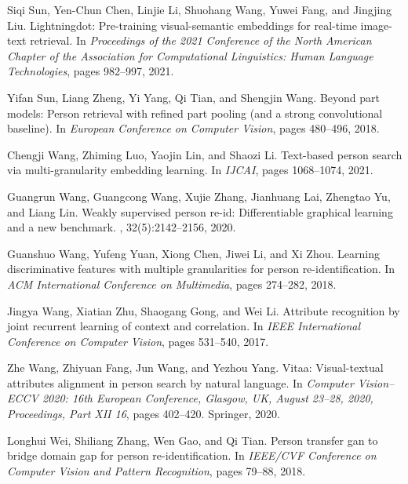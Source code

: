 \documentclass[10pt,twocolumn,letterpaper]{article}
\begin{document}
\begin{thebibliography}{10}
Siqi Sun, Yen-Chun Chen, Linjie Li, Shuohang Wang, Yuwei Fang, and Jingjing
  Liu.
\newblock Lightningdot: Pre-training visual-semantic embeddings for real-time
  image-text retrieval.
\newblock In {\em Proceedings of the 2021 Conference of the North American
  Chapter of the Association for Computational Linguistics: Human Language
  Technologies}, pages 982--997, 2021.

Yifan Sun, Liang Zheng, Yi Yang, Qi Tian, and Shengjin Wang.
\newblock Beyond part models: Person retrieval with refined part pooling (and a
  strong convolutional baseline).
\newblock In {\em European Conference on Computer Vision}, pages 480--496,
  2018.

Chengji Wang, Zhiming Luo, Yaojin Lin, and Shaozi Li.
\newblock Text-based person search via multi-granularity embedding learning.
\newblock In {\em IJCAI}, pages 1068--1074, 2021.

Guangrun Wang, Guangcong Wang, Xujie Zhang, Jianhuang Lai, Zhengtao Yu, and
  Liang Lin.
\newblock Weakly supervised person re-id: Differentiable graphical learning and
  a new benchmark.
,
  32(5):2142--2156, 2020.

Guanshuo Wang, Yufeng Yuan, Xiong Chen, Jiwei Li, and Xi Zhou.
\newblock Learning discriminative features with multiple granularities for
  person re-identification.
\newblock In {\em ACM International Conference on Multimedia}, pages 274--282,
  2018.

Jingya Wang, Xiatian Zhu, Shaogang Gong, and Wei Li.
\newblock Attribute recognition by joint recurrent learning of context and
  correlation.
\newblock In {\em IEEE International Conference on Computer Vision}, pages
  531--540, 2017.

Zhe Wang, Zhiyuan Fang, Jun Wang, and Yezhou Yang.
\newblock Vitaa: Visual-textual attributes alignment in person search by
  natural language.
\newblock In {\em Computer Vision--ECCV 2020: 16th European Conference,
  Glasgow, UK, August 23--28, 2020, Proceedings, Part XII 16}, pages 402--420.
  Springer, 2020.

Longhui Wei, Shiliang Zhang, Wen Gao, and Qi Tian.
\newblock Person transfer gan to bridge domain gap for person
  re-identification.
\newblock In {\em IEEE/CVF Conference on Computer Vision and Pattern
  Recognition}, pages 79--88, 2018.


\end{thebibliography}
\end{document}
